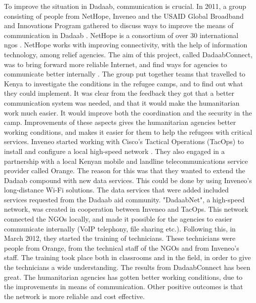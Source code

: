 To improve the situation in Dadaab, communication is crucial. In 2011, a group consisting of people from NetHope, Inveneo and the USAID Global Broadband and Innovations Program gathered to discuss ways to improve the means of communication in Dadaab \cite{dadaab}. NetHope is a consortium of over 30 international \glspl{ngo} \cite{nethope}. NetHope works with improving connectivity, with the help of information technology, among relief agencies. The aim of this project, called DadaabConnect, was to bring forward more reliable Internet, and find ways for agencies to communicate better internally \cite{dadaab}. The group put together teams that travelled to Kenya to investigate the conditions in the refugee camps, and to find out what they could implement. It was clear from the feedback they got that a better communication system was needed, and that it would make the humanitarian work much easier. It would improve both the coordination and the security in the camp. Improvements of these aspects gives the humanitarian agencies better working conditions, and makes it easier for them to help the refugees with critical services. Inveneo started working with Cisco's Tactical Operations (TacOps) to install and configure a local high-speed network \cite{dadaabinveneo}. They also engaged in a partnership with a local Kenyan mobile and landline telecommunications service provider called Orange. The reason for this was that they wanted to extend the Dadaab compound with new data services. This could be done by using Inveneo's long-distance Wi-Fi solutions. The data services that were added included services requested from the Dadaab aid community. "DadaabNet", a high-speed network, was created in cooperation between Inveneo and TacOps. This network connected the NGOs locally, and made it possible for the agencies to easier communicate internally (VoIP telephony, file sharing etc.). Following this, in March 2012, they started the training of technicians. These technicians were people from Orange, from the technical staff of the NGOs and from Inveneo's staff. The training took place both in classrooms and in the field, in order to give the technicians a wide understanding. The results from DadaabConnect has been great. The humanitarian agencies has gotten better working conditions, due to the improvements in means of communication. Other positive outcomes is that the network is more reliable and cost effective. 

